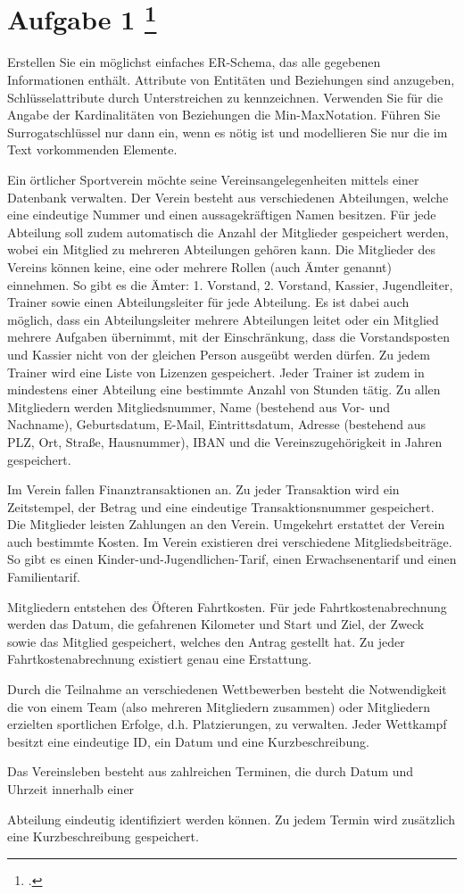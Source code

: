 \documentclass{lehramt-informatik-aufgabe}
\begin{document}
\section{Aufgabe 1
\footcite{examen:66116:2019:09}}

Erstellen Sie ein möglichst einfaches ER-Schema, das alle gegebenen
Informationen enthält. Attribute von Entitäten und Beziehungen sind
anzugeben, Schlüsselattribute durch Unterstreichen zu kennzeichnen.
Verwenden Sie für die Angabe der Kardinalitäten von Beziehungen die
Min-MaxNotation. Führen Sie Surrogatschlüssel nur dann ein, wenn es
nötig ist und modellieren Sie nur die im Text vorkommenden Elemente.

Ein örtlicher Sportverein möchte seine Vereinsangelegenheiten mittels
einer Datenbank verwalten. Der Verein besteht aus verschiedenen
Abteilungen, welche eine eindeutige Nummer und einen aussagekräftigen
Namen besitzen. Für jede Abteilung soll zudem automatisch die Anzahl der
Mitglieder gespeichert werden, wobei ein Mitglied zu mehreren
Abteilungen gehören kann. Die Mitglieder des Vereins können keine, eine
oder mehrere Rollen (auch Ämter genannt) einnehmen. So gibt es die
Ämter: 1. Vorstand, 2. Vorstand, Kassier, Jugendleiter, Trainer sowie
einen Abteilungsleiter für jede Abteilung. Es ist dabei auch möglich,
dass ein Abteilungsleiter mehrere Abteilungen leitet oder ein Mitglied
mehrere Aufgaben übernimmt, mit der Einschränkung, dass die
Vorstandsposten und Kassier nicht von der gleichen Person ausgeübt
werden dürfen. Zu jedem Trainer wird eine Liste von Lizenzen
gespeichert. Jeder Trainer ist zudem in mindestens einer Abteilung eine
bestimmte Anzahl von Stunden tätig. Zu allen Mitgliedern werden
Mitgliedsnummer, Name (bestehend aus Vor- und Nachname), Geburtsdatum,
E-Mail, Eintrittsdatum, Adresse (bestehend aus PLZ, Ort, Straße,
Hausnummer), IBAN und die Vereinszugehörigkeit in Jahren gespeichert.

Im Verein fallen Finanztransaktionen an. Zu jeder Transaktion wird ein
Zeitstempel, der Betrag und eine eindeutige Transaktionsnummer
gespeichert. Die Mitglieder leisten Zahlungen an den Verein. Umgekehrt
erstattet der Verein auch bestimmte Kosten. Im Verein existieren drei
verschiedene Mitgliedsbeiträge. So gibt es einen
Kinder-und-Jugendlichen-Tarif, einen Erwachsenentarif und einen
Familientarif.

Mitgliedern entstehen des Öfteren Fahrtkosten. Für jede
Fahrtkostenabrechnung werden das Datum, die gefahrenen Kilometer und
Start und Ziel, der Zweck sowie das Mitglied gespeichert, welches den
Antrag gestellt hat. Zu jeder Fahrtkostenabrechnung existiert genau eine
Erstattung.

Durch die Teilnahme an verschiedenen Wettbewerben besteht die
Notwendigkeit die von einem Team (also mehreren Mitgliedern zusammen)
oder Mitgliedern erzielten sportlichen Erfolge, d.h. Platzierungen, zu
verwalten. Jeder Wettkampf besitzt eine eindeutige ID, ein Datum und
eine Kurzbeschreibung.

Das Vereinsleben besteht aus zahlreichen Terminen, die durch Datum und
Uhrzeit innerhalb einer

Abteilung eindeutig identifiziert werden können. Zu jedem Termin wird
zusätzlich eine Kurzbeschreibung gespeichert.
\end{document}
